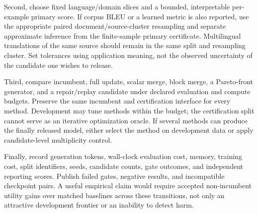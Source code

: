 \documentclass[11pt,letterpaper]{article}
\begin{document}
Second, choose fixed language/domain slices and a bounded, interpretable per-example primary score. If corpus BLEU or a learned metric is also reported, use the appropriate paired document/source-cluster resampling and separate approximate inference from the finite-sample primary certificate. Multilingual translations of the same source should remain in the same split and resampling cluster. Set tolerances using application meaning, not the observed uncertainty of the candidate one wishes to release.

Third, compare incumbent, full update, scalar merge, block merge, a Pareto-front generator, and a repair/replay candidate under declared evaluation and compute budgets. Preserve the same incumbent and certification interface for every method. Development may tune methods within the budget; the certification split cannot serve as an iterative optimization oracle. If several methods can produce the finally released model, either select the method on development data or apply candidate-level multiplicity control.

Finally, record generation tokens, wall-clock evaluation cost, memory, training cost, split identifiers, seeds, candidate counts, gate outcomes, and independent reporting scores. Publish failed gates, negative results, and incompatible checkpoint pairs. A useful empirical claim would require accepted non-incumbent utility gains over matched baselines across these transitions, not only an attractive development frontier or an inability to detect harm.
\end{document}

